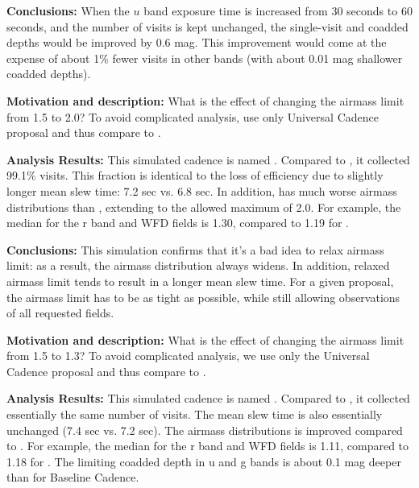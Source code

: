 {\bf Conclusions:} When the $u$ band exposure time is increased from
30 seconds to 60 seconds, and the number of visits is kept unchanged,
the single-visit and coadded depths would be improved by 0.6 mag. This
improvement would come at the expense of about 1\% fewer visits in
other bands (with about 0.01 mag shallower coadded depths).



{\bf Motivation and description:}  What is the effect of changing the
airmass limit from 1.5 to 2.0?  To avoid complicated analysis, use
only Universal Cadence proposal and thus compare to
.


{\bf Analysis Results:}  This simulated cadence is named
.  Compared to
, it collected 99.1\% visits. This fraction is
identical to the loss of efficiency due to slightly longer mean slew
time: 7.2 sec vs. 6.8 sec. In addition,
 has much worse airmass
distributions than ,  extending to the allowed
maximum of 2.0. For example, the median for the r band and WFD fields
is 1.30, compared to 1.19 for .

{\bf Conclusions:} This simulation confirms that it's a bad idea to
relax airmass limit: as a result, the airmass distribution always
widens. In addition, relaxed airmass limit tends to result in a longer
mean slew time.  For a given proposal, the airmass limit has to be as
tight as possible, while still allowing observations of all requested
fields.




{\bf Motivation and description:} What is the effect of changing the
airmass limit from 1.5 to 1.3? To avoid complicated analysis, we use
only the Universal Cadence proposal and thus compare to
.

 {\bf Analysis Results:}  This simulated cadence is named
 . Compared to
 , it collected essentially the same number of
 visits. The mean slew time is also essentially unchanged (7.4 sec vs.
 7.2 sec). The airmass distributions is improved compared to
 . For example, the median for the r band and
 WFD fields is 1.11, compared to 1.18 for .  The
 limiting coadded depth in u and g bands is about 0.1 mag deeper than
 for Baseline Cadence.

